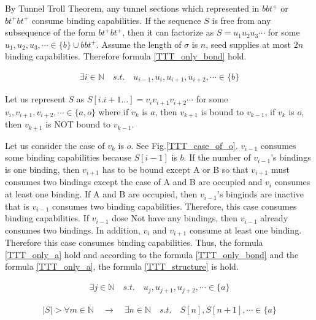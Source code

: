\documentclass[runningheads]{llncs}
\begin{document}
By Tunnel Troll Theorem, any tunnel sections which represented in $bbt^+$ or $bt^+bt^+$ consume binding capabilities. If the sequence $S$ is free from any subsequence of the form $bt^+bt^+$, then it can factorize as $S = u_1 u_2 u_3 \cdots$ for some $u_1 , u_2 , u_3 , \cdots \in \{b\} \cup bbt^+$. Assume the length of $\sigma$ is $n$, seed supplies at most $2n$ binding capabilities. Therefore formula \ref{TTT_only_bond} hold.

\begin{eqnarray}
  \exists i \in \mathbb{N} \quad s.t. \quad u_{i-1} , u_i , u_{i+1} , u_{i+2} , \cdots \in \{ b \}
  \label{TTT_only_bond}
\end{eqnarray}


Let us represent $S$ as $S[i.i+1...] = v_i v_{i+1} v_{i+2} \cdots$ for some $v_i, v_{i+1}, v_{i+2}, \cdots \in \{ a, o\}$ where if $v_k$ is $a$, then $v_{k+1}$ is bound to $v_{k-1}$, if $v_k$ is $o$, then $v_{k+1}$ is NOT bound to $v_{k-1}$.


Let us consider the case of $v_k$ is $o$. See Fig.\ref{TTT_case_of_o}. $v_{i-1}$ consumes some binding capabilities because $S[i-1]$ is $b$. If the number of $v_{i-1}$'s bindings is one binding, then $v_{i+1}$ has to be bound except A or B so that $v_{i+1}$ must consumes two bindings except the case of A and B are occupied and $v_i$ consumes at least one binding. If A and B are occupied, then $v_{i-1}$'s binginds are inactive that is $v_{i-1}$ consumes two binding capabilities. Therefore, this case consumes binding capabilities. If $v_{i-1}$ dose Not have any bindings, then $v_{i-1}$ already consumes two bindings. In addition, $v_i$ and $v_{i+1}$ consume at least one binding. Therefore this case consumes binding capabilities. Thus, the formula \ref{TTT_only_a} hold and according to the formula \ref{TTT_only_bond} and the formula \ref{TTT_only_a}, the formula \ref{TTT_structure} is hold.

\begin{eqnarray}
  \exists j \in \mathbb{N} \quad s.t. \quad u_j , u_{j+1} , u_{j+2} , \cdots \in \{ a \}
  \label{TTT_only_a}
\end{eqnarray}

\begin{eqnarray}
  | S | > \forall m \in \mathbb{N} \quad \to \quad \exists n \in \mathbb{N} \quad s.t. \quad S[n], S[n+1], \cdots \in \{ a \}
  \label{TTT_structure}
\end{eqnarray}
\end{document}
